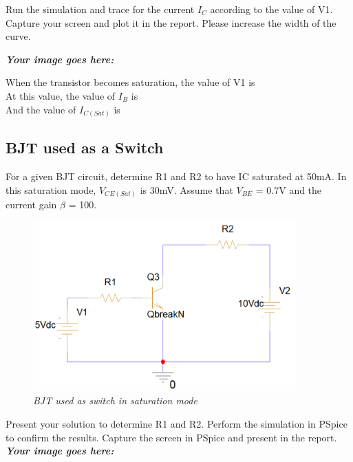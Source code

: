 Run the simulation and trace for the current $I_C$ according to the value of V1. Capture your screen and plot it in the report. Please increase the width of the curve.

\textbf{\textit{Your image goes here:}}\\
\vspace{6cm}


When the transistor becomes saturation, the value of V1 is \dotfill\bigskip\\
At this value, the value of $I_B$ is \dotfill\bigskip\\
And the value of $I_{C(Sat)}$ is \dotfill\bigskip\\


\subsection{BJT used as a Switch}
For a given BJT circuit, determine R1 and R2 to have IC saturated at 50mA. In this saturation mode, $V_{CE(Sat)}$ is 30mV. Assume that $V_{BE}$ = 0.7V and the current gain $\beta$ = 100.

\newpage
\begin{figure}[!htp]
    \centering
    \includegraphics[width=4in]{source/picture/bai_3/pic2.PNG}
    \caption{\textit{BJT used as switch in saturation mode}}
    \label{bai3_manual_2}
\end{figure}


Present your solution to determine R1 and R2.
Perform the simulation in PSpice to confirm the results. Capture the screen in PSpice and present in the report.\\




\textbf{\textit{Your image goes here:}}\\
\vspace{6cm}


